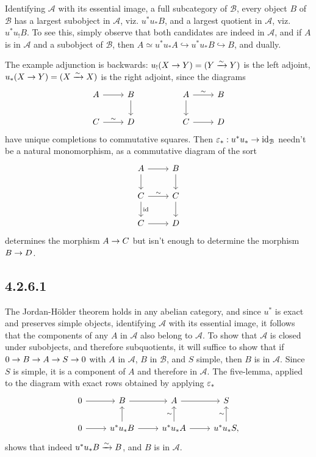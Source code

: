 \documentclass[deligne.tex]{subfiles}
\begin{document}
Identifying $\mathcal A$ with its essential image, a full subcategory of
$\mathcal B$, every object $B$ of $\mathcal B$ has a largest subobject in
$\mathcal A$, viz. $u^*u_*B$, and a largest quotient in $\mathcal A$, viz.
$u^*u_!B$. To see this, simply observe that both candidates are indeed in
$\mathcal A$, and if $A$ is in $\mathcal A$ and a subobject of $\mathcal B$,
then $A\simeq u^*u_*A\hookrightarrow u^*u_*B\hookrightarrow B$, and dually.

The example adjunction is backwards:
$u_!(X\rightarrow Y)=(Y\xrightarrow{\sim}Y)$ is the left adjoint,
$u_*(X\rightarrow Y)=(X\xrightarrow\sim X)$ is the right adjoint, since the diagrams
\begin{equation*}\begin{tikzcd}
	A\arrow[r]&B\arrow[d] && A\arrow[r,"\sim"]\arrow[d]&B \\
	C\arrow[r,"\sim"]&D && C\arrow[r]&D
\end{tikzcd}\end{equation*}
have unique completions to commutative squares.
Then $\varepsilon_*:u^*u_*\rightarrow\operatorname{id}_{\mathcal B}$ needn't be a natural monomorphism, 
as a commutative diagram of the sort
\begin{equation*}\begin{tikzcd}
	A\arrow[d]\arrow[r]&B\arrow[d] \\
	C\arrow[r,"\sim"]\arrow[d,"\id"]&C\arrow[d] \\
	C\arrow[r]&D
\end{tikzcd}\end{equation*}
determines the morphism $A\rightarrow C$ but isn't enough to determine the morphism
$B\rightarrow D$.

\subsection*{4.2.6.1}
The Jordan-H\"older theorem holds in any abelian category, and since $u^*$
is exact and preserves simple objects, identifying $\mathcal A$ with its
essential image, it follows that the components of any $A$ in $\mathcal A$
also belong to $\mathcal A$. To show that $\mathcal A$ is closed under
subobjects, and therefore subquotients, it will suffice to show that if
$0\rightarrow B\rightarrow A\rightarrow S\rightarrow0$ with $A$ in $\mathcal A$, $B$ in $\mathcal B$, and
$S$ simple, then $B$ is in $\mathcal A$. Since $S$ is simple, it is a
component of $A$ and therefore in $\mathcal A$. The five-lemma, applied to
the diagram with exact rows obtained by applying $\varepsilon_*$
\begin{equation*}\begin{tikzcd}
	0\arrow[r]&B\arrow[r]&A\arrow[r]&S \\
	0\arrow[r]&u^*u_*B\arrow[r]\arrow[u]
	&u^*u_*A\arrow[u,"\sim"]\arrow[r]&u^*u_*S\arrow[u,"\sim"],
\end{tikzcd}\end{equation*}
shows that indeed $u^*u_*B\xrightarrow\sim B$, and $B$ is in $\mathcal A$.
\end{document}
